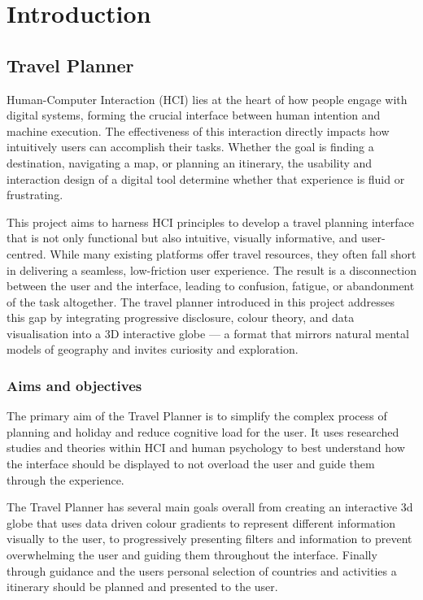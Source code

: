 \documentclass[]{project_final}
\begin{document}

\chapter{Introduction}
\section{Travel Planner}
Human-Computer Interaction (HCI) lies at the heart of how people engage with digital systems, forming the crucial interface between human intention and machine execution. The effectiveness of this interaction directly impacts how intuitively users can accomplish their tasks. Whether the goal is finding a destination, navigating a map, or planning an itinerary, the usability and interaction design of a digital tool determine whether that experience is fluid or frustrating.

This project aims to harness HCI principles to develop a travel planning interface that is not only functional but also intuitive, visually informative, and user-centred. While many existing platforms offer travel resources, they often fall short in delivering a seamless, low-friction user experience. The result is a disconnection between the user and the interface, leading to confusion, fatigue, or abandonment of the task altogether. The travel planner introduced in this project addresses this gap by integrating progressive disclosure, colour theory, and data visualisation into a 3D interactive globe — a format that mirrors natural mental models of geography and invites curiosity and exploration.
\subsection{Aims and objectives}
The primary aim of the Travel Planner is to simplify the complex process of planning and holiday and reduce cognitive load for the user. It uses researched studies and theories within HCI and human psychology to best understand how the interface should be displayed to not overload the user and guide them through the experience.

The Travel Planner has several main goals overall from creating an interactive 3d globe that uses data driven colour gradients to represent different information visually to the user, to progressively presenting filters and information to prevent overwhelming the user and guiding them throughout the interface. Finally through guidance and the users personal selection of countries and activities a itinerary should be planned and presented to the user.
\end{document}
